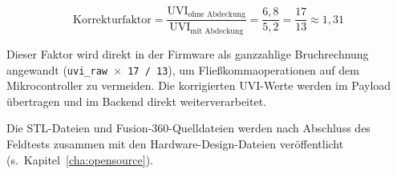 \begin{equation}
  \text{Korrekturfaktor} = \frac{\text{UVI}_\text{ohne Abdeckung}}{\text{UVI}_\text{mit Abdeckung}} = \frac{6{,}8}{5{,}2} = \frac{17}{13} \approx 1{,}31
\end{equation}

Dieser Faktor wird direkt in der Firmware als ganzzahlige Bruchrechnung angewandt (\texttt{uvi\_raw $\times$ 17 / 13}), um Fließkommaoperationen auf dem Mikrocontroller zu vermeiden. Die korrigierten UVI-Werte werden im Payload übertragen und im Backend direkt weiterverarbeitet.

Die STL-Dateien und Fusion-360-Quelldateien werden nach Abschluss des Feldtests zusammen mit den Hardware-Design-Dateien veröffentlicht (s.\ Kapitel~\ref{cha:opensource}).
